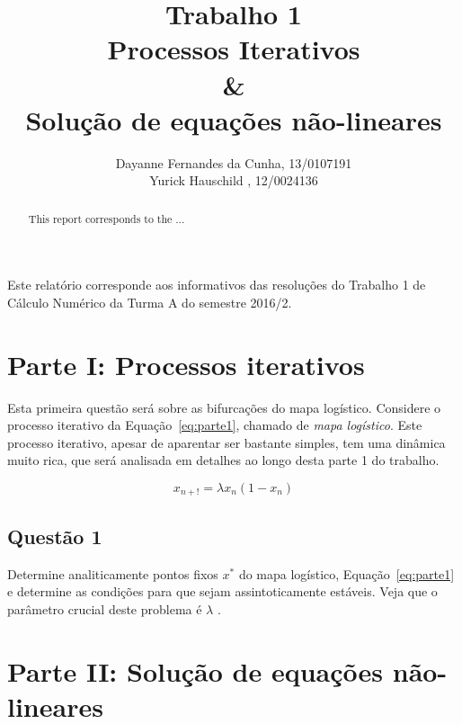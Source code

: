 \documentclass[12pt]{article}
\title{Trabalho 1\\ 
Processos Iterativos\\ 
\&\\
Solução de equações não-lineares}
\author{Dayanne Fernandes da Cunha, 13/0107191\\
       Yurick Hauschild , 12/0024136
}
\begin{document}
 
\maketitle

 \begin{abstract}
	This report corresponds to the ...
 \end{abstract}
    
 \begin{resumo} 
 	Este relatório corresponde aos informativos das resoluções do Trabalho 1 de Cálculo Numérico da Turma A do semestre 2016/2.
 \end{resumo}

\section*{Parte I: Processos iterativos}
\label{sec:parte1}

Esta primeira questão será sobre as bifurcações do mapa logístico. Considere o processo iterativo da Equação~\ref{eq:parte1}, chamado de \textit{mapa logístico}. Este processo iterativo, apesar de aparentar ser bastante simples, tem uma dinâmica muito rica, que será analisada em detalhes ao longo desta parte 1 do trabalho.

\begin{equation}
x_{n+!} = \lambda x_{n}(1 - x_{n})
\label{eq:parte1}
\end{equation}

\subsection*{Questão 1}
\label{sec:p1q1}
Determine analiticamente pontos fixos $x^{*}$ do mapa logístico, Equação~\ref{eq:parte1} e determine as condições para que sejam assintoticamente estáveis. Veja que o parâmetro crucial deste problema é $\lambda$ .

\section*{Parte II: Solução de equações não-lineares}
\label{sec:parte2}
\end{document}
